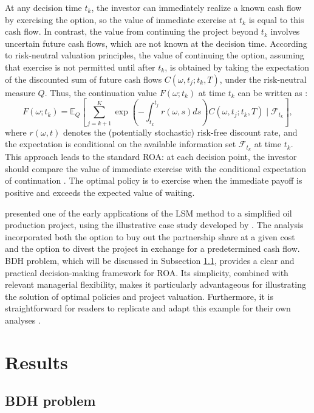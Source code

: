 \documentclass[pdflatex,sn-basic]{sn-jnl}%
\theoremstyle{thmstyleone}%
\theoremstyle{thmstyletwo}%
\theoremstyle{thmstylethree}%
\begin{document}
At any decision time $t_k$, the investor can immediately realize a known cash flow by exercising the option, so the value of immediate exercise at $t_k$ is equal to this cash flow. In contrast, the value from continuing the project beyond $t_k$ involves uncertain future cash flows, which are not known at the decision time. According to risk-neutral valuation principles, the value of continuing the option, assuming that exercise is not permitted until after $t_k$, is obtained by taking the expectation of the discounted sum of future cash flows $C(\omega, t_j; t_k, T)$, under the risk-neutral measure $Q$. Thus, the continuation value $F(\omega; t_k)$ at time $t_k$ can be written as \citep{ref14}:
\begin{equation}
F(\omega; t_k) = \mathbb{E}_Q \left[ \sum_{j=k+1}^K \exp \left( -\int_{t_k}^{t_j} r(\omega, s) ds \right) C(\omega, t_j; t_k, T) \; \bigg| \; \mathcal{F}_{t_k} \right],
\end{equation}
where $r(\omega, t)$ denotes the (potentially stochastic) risk-free discount rate, and the expectation is conditional on the available information set $\mathcal{F}_{t_k}$ at time $t_k$. This approach leads to the standard ROA: at each decision point, the investor should compare the value of immediate exercise with the conditional expectation of continuation \citep{ref14}. The optimal policy is to exercise when the immediate payoff is positive and exceeds the expected value of waiting.


\cite{ref13} presented one of the early applications of the LSM method to a simplified oil production project, using the illustrative case study developed by \cite{ref12a, ref12b}. The analysis incorporated both the option to buy out the partnership share at a given cost and the option to divest the project in exchange for a predetermined cash flow. BDH problem, which will be discussed in Subsection \ref{subsec51}, provides a clear and practical decision-making framework for ROA. Its simplicity, combined with relevant managerial flexibility, makes it particularly advantageous for illustrating the solution of optimal policies and project valuation. Furthermore, it is straightforward for readers to replicate and adapt this example for their own analyses \citep{ref15}.

\section{Results}\label{sec5}

\subsection{BDH problem}\label{subsec51}
\end{document}
